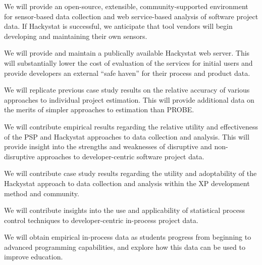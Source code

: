 \begin{smallenum2}

\item We will provide an open-source, extensible, community-supported
environment for sensor-based data collection and web service-based analysis
of software project data. 
If Hackystat is successful, we anticipate that
tool vendors will begin developing and maintaining their own sensors. 

\item We will provide and maintain a publically available Hackystat web
server.  This will substantially lower the cost of
evaluation of the services for initial users and provide developers an
external ``safe haven'' for their process and product data.

\item We will replicate previous case study results on the
relative accuracy of various approaches to individual project
estimation. This will provide additional data on the merits of simpler
approaches to estimation than PROBE.

\item We will contribute empirical results regarding the relative utility
and effectiveness of the PSP and Hackystat approaches to data collection
and analysis. This will provide insight into the strengths and weaknesses
of disruptive and non-disruptive approaches to developer-centric software
project data.

\item We will contribute case study results regarding the utility and
adoptability of the Hackystat approach to data collection and analysis
within the XP development method and community.

\item We will contribute insights into the use and applicability of
statistical process control techniques to developer-centric in-process
project data.

\item We will obtain empirical in-process data as students progress from
beginning to advanced programming capabilities, and explore how this data
can be used to improve education.
\end{smallenum2}











